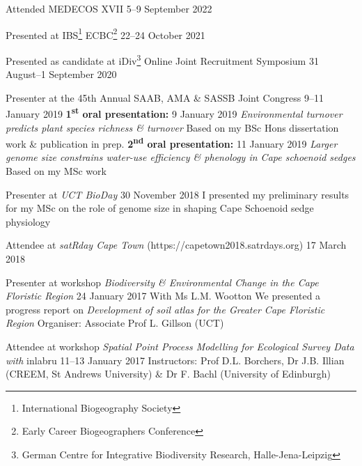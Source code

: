 \documentclass[10pt]{article}
\begin{document}
\begin{hangparas}{2em}{1}

Attended MEDECOS XVII                 \hfill 5--9 September 2022 \break

Presented at IBS\footnote{International Biogeography Society}
ECBC\footnote{Early Career Biogeographers Conference}
                                      \hfill 22--24 October 2021 \break

Presented as candidate at iDiv\footnote{German Centre for Integrative
Biodiversity Research, Halle-Jena-Leipzig} Online Joint Recruitment Symposium
                              \hfill 31 August--1 September 2020 \break

Presenter at the 45th Annual SAAB, AMA \& SASSB Joint Congress
                                       \hfill 9--11 January 2019 \break
\textbf{1\textsuperscript{st} oral presentation:}
                                           \hfill 9 January 2019 \break
\textit{Environmental turnover predicts plant species richness \& turnover}
\break
Based on my BSc Hons dissertation work \& publication in prep. \break
\textbf{2\textsuperscript{nd} oral presentation:}
                                          \hfill 11 January 2019 \break
\textit{Larger genome size constrains water-use efficiency \& phenology in 
Cape schoenoid sedges} \break
Based on my MSc work

Presenter at \textit{UCT BioDay}         \hfill 30 November 2018 \break
I presented my preliminary results for my MSc on the role of genome size in 
shaping Cape Schoenoid sedge physiology

Attendee at \textit{satRday Cape Town} (https://capetown2018.satrdays.org)
                                                   \hfill 17 March 2018

Presenter at workshop \textit{Biodiversity \& Environmental Change in the Cape 
Floristic Region}                         \hfill 24 January 2017 \break
With Ms L.M. Wootton \break
We presented a progress report on \textit{Development of soil atlas for the 
Greater Cape Floristic Region} \break
Organiser: Associate Prof L. Gillson (UCT)

Attendee at workshop \textit{Spatial Point Process Modelling for Ecological 
Survey Data with} inlabru             \hfill 11--13 January 2017 \break
Instructors: Prof D.L. Borchers, Dr J.B. Illian (CREEM, St Andrews University) 
\& Dr F. Bachl (University of Edinburgh)

\hfill

\end{hangparas}
\end{document}
